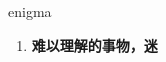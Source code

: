
\begin{frame}
{\huge enigma}
\begin{center}
\begin{enumerate}\Large
  \item \textbf{难以理解的事物，迷}
\end{enumerate}
\end{center}
\end{frame}
